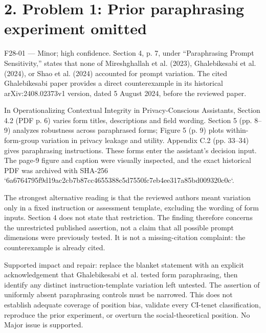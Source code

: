 \documentclass[10pt]{article}
\begin{document}
\section*{2. Problem 1: Prior paraphrasing experiment omitted}
F28-01 — Minor; high confidence. Section 4, p. 7, under “Paraphrasing Prompt Sensitivity,” states that none of Mireshghallah et al. (2023), Ghalebikesabi et al. (2024), or Shao et al. (2024) accounted for prompt variation. The cited Ghalebikesabi paper provides a direct counterexample in its historical arXiv:2408.02373v1 version, dated 5 August 2024, before the reviewed paper.\par
In Operationalizing Contextual Integrity in Privacy-Conscious Assistants, Section 4.2 (PDF p. 6) varies form titles, descriptions and field wording. Section 5 (pp. 8–9) analyzes robustness across paraphrased forms; Figure 5 (p. 9) plots within-form-group variation in privacy leakage and utility. Appendix C.2 (pp. 33–34) gives paraphrasing instructions. These forms enter the assistant’s decision input. The page-9 figure and caption were visually inspected, and the exact historical PDF was archived with SHA-256 `6a6764795f9d19ac2cb7b87cc4655388c5d7550fc7eb4ee317a85bd009320c0c`.\par
The strongest alternative reading is that the reviewed authors meant variation only in a fixed instruction or assessment template, excluding the wording of form inputs. Section 4 does not state that restriction. The finding therefore concerns the unrestricted published assertion, not a claim that all possible prompt dimensions were previously tested. It is not a missing-citation complaint: the counterexample is already cited.\par
Supported impact and repair: replace the blanket statement with an explicit acknowledgement that Ghalebikesabi et al. tested form paraphrasing, then identify any distinct instruction-template variation left untested. The assertion of uniformly absent paraphrasing controls must be narrowed. This does not establish adequate coverage of position bias, validate every CI-tenet classification, reproduce the prior experiment, or overturn the social-theoretical position. No Major issue is supported.\par
\end{document}
